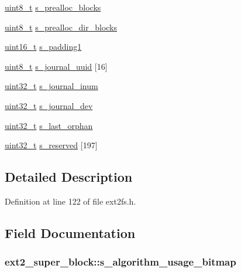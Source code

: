 \begin{DoxyCompactItemize}
\item 
\hyperlink{types_8h_aba7bc1797add20fe3efdf37ced1182c5}{uint8\-\_\-t} \hyperlink{structext2__super__block_a352689df3b3cb2a357bde6645e3c7f29}{s\-\_\-prealloc\-\_\-blocks}
\item 
\hyperlink{types_8h_aba7bc1797add20fe3efdf37ced1182c5}{uint8\-\_\-t} \hyperlink{structext2__super__block_aa820a721fcbf64ee9aa797bca3171785}{s\-\_\-prealloc\-\_\-dir\-\_\-blocks}
\item 
\hyperlink{types_8h_a273cf69d639a59973b6019625df33e30}{uint16\-\_\-t} \hyperlink{structext2__super__block_a1b0760049d39f6cfb1b26af0a01f64d2}{s\-\_\-padding1}
\item 
\hyperlink{types_8h_aba7bc1797add20fe3efdf37ced1182c5}{uint8\-\_\-t} \hyperlink{structext2__super__block_a31f78875053afe2073c72ab700e831cd}{s\-\_\-journal\-\_\-uuid} \mbox{[}16\mbox{]}
\item 
\hyperlink{types_8h_a435d1572bf3f880d55459d9805097f62}{uint32\-\_\-t} \hyperlink{structext2__super__block_a593535b5ffb1b5480f887e0aae0be698}{s\-\_\-journal\-\_\-inum}
\item 
\hyperlink{types_8h_a435d1572bf3f880d55459d9805097f62}{uint32\-\_\-t} \hyperlink{structext2__super__block_a5c65ec434f4b1394d6ec68fb8d055a4e}{s\-\_\-journal\-\_\-dev}
\item 
\hyperlink{types_8h_a435d1572bf3f880d55459d9805097f62}{uint32\-\_\-t} \hyperlink{structext2__super__block_a48682cfbe704f555d18fe030f1ee6fe6}{s\-\_\-last\-\_\-orphan}
\item 
\hyperlink{types_8h_a435d1572bf3f880d55459d9805097f62}{uint32\-\_\-t} \hyperlink{structext2__super__block_a20ae39840c7a2e27ca6c8f4833db0e24}{s\-\_\-reserved} \mbox{[}197\mbox{]}
\end{DoxyCompactItemize}


\subsection{\-Detailed \-Description}


\-Definition at line 122 of file ext2fs.\-h.



\subsection{\-Field \-Documentation}
\hypertarget{structext2__super__block_ab3772dfdb48734922447cc462e5495ed}{
\subsubsection[{s\-\_\-algorithm\-\_\-usage\-\_\-bitmap}]{ {\bf ext2\-\_\-super\-\_\-block\-::s\-\_\-algorithm\-\_\-usage\-\_\-bitmap}}}\label{structext2__super__block_ab3772dfdb48734922447cc462e5495ed}


